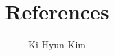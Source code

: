 \documentclass[runningheads]{llncs}
\begin{document}
%
\title{References}
%
%
\author{Ki Hyun Kim
}
%
%


%
\maketitle              %
%
~\cite{DBLP:journals/corr/KingmaB14}
\newpage

%
%
%
% 
% 
%


%
%
%
%
\end{document}
